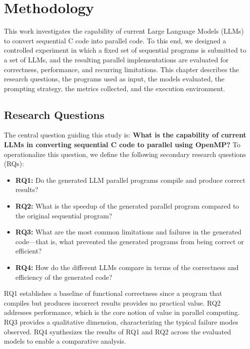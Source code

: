 \documentclass[conference]{IEEEtran}
\begin{document}
\section{Methodology} \label{sec:methodology}

This work investigates the capability of current Large Language Models (LLMs) to convert sequential C code into parallel code.
To this end, we designed a controlled experiment in which a fixed set of sequential programs is submitted to a set of LLMs, and the resulting parallel implementations are evaluated for correctness, performance, and recurring limitations.
This chapter describes the research questions, the programs used as input, the models evaluated, the prompting strategy, the metrics collected, and the execution environment.

\subsection{Research Questions} \label{sec:rqs}

The central question guiding this study is:
\textbf{What is the capability of current LLMs in converting sequential C code to parallel %
using OpenMP?}
To operationalize this question, we define the following secondary research questions (RQs):

\begin{itemize}
\item \textbf{RQ1:} Do the generated LLM parallel programs compile and produce correct results?
\item \textbf{RQ2:} What is the speedup of the generated parallel program compared to the original sequential program?
\item \textbf{RQ3:} What are the most common limitations and failures in the generated code—that is, what prevented the generated programs from being correct or efficient?
\item \textbf{RQ4:} How do the different LLMs compare in terms of the correctness and efficiency of the generated code? %
\end{itemize}

RQ1 establishes a baseline of functional correctness since a program that compiles but produces incorrect results provides no practical value.
RQ2 addresses performance, which is the core notion of value in parallel computing.
RQ3 provides a qualitative dimension, characterizing the typical failure modes observed.
RQ4 synthesizes the results of RQ1 and RQ2 across the evaluated models to enable a comparative analysis.
\end{document}
